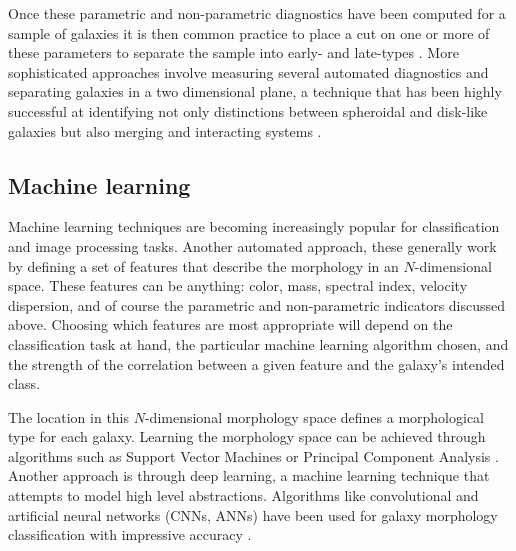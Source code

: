 Once these parametric and non-parametric diagnostics have been computed for a sample of galaxies it is then common practice to place a cut on one or more of these parameters to separate the sample into early- and late-types \citep{Shen2003}. More sophisticated approaches involve measuring several automated diagnostics and separating galaxies in a two dimensional plane, a technique that has been highly successful at identifying not only distinctions between spheroidal and disk-like galaxies but also merging and interacting systems \citep{Lotz2004, Conselice2000, Conselice2003,Freeman2013}. 




\subsection{Machine learning}
Machine learning techniques are becoming increasingly popular for classification and image processing tasks. Another automated approach, these generally work by defining a set of features that describe the morphology in an $N$-dimensional space. These features can be anything: color, mass, spectral index, velocity dispersion, and of course the parametric and non-parametric indicators discussed above. Choosing which features are most appropriate will depend on the classification task at hand, the particular machine learning algorithm chosen, and the strength of the correlation between a given feature and the galaxy's intended class. 

The location in this $N$-dimensional morphology space defines a morphological type for each galaxy. Learning the morphology space can be achieved through algorithms such as Support Vector Machines \citep{HuertasCompany2008} or Principal Component Analysis \citep{Watanabe1985, Conselice2006, Scarlata2007, Peth2016}. Another approach is through deep learning, a machine learning technique that attempts to model high level abstractions. Algorithms like convolutional and artificial neural networks (CNNs, ANNs) have been used for galaxy morphology classification with impressive accuracy \citep{Ball2004, 	Banerji2010, Dieleman2015, HuertasCompany2015,DominguezSanchez2017}. 

